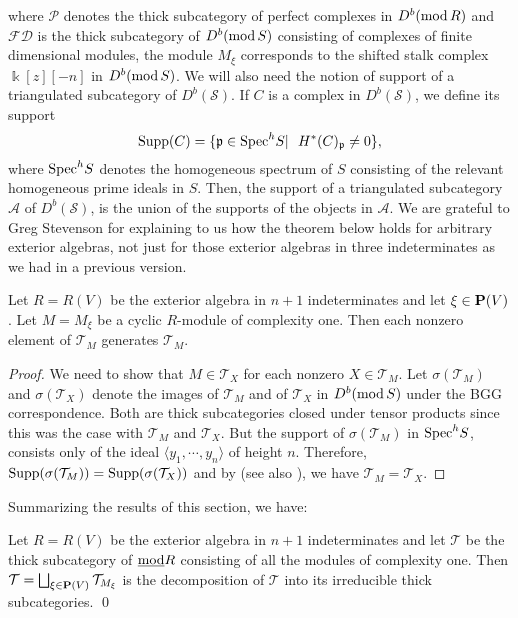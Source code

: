 \documentclass[10pt]{amsart}
\begin{document}
\noindent where $\mathcal P$ denotes the thick subcategory of perfect complexes in $D^b(\operatorname{mod} R)$ and $\mathcal {FD}$ is the thick subcategory of $D^b(\operatorname{mod} S)$ consisting of complexes of finite dimensional modules, the module $M_{\xi}$ corresponds to the shifted stalk complex $\Bbbk[z][-n]$ in $D^b(\operatorname{mod} S)$. We will also need the notion of support of a triangulated subcategory of $D^b(\mathcal S)$. If $C$ is a complex in $D^b(\mathcal S)$, we define its support $$\operatorname{Supp}(C)=\{\frak p\in\mbox{Spec}^hS|\ \ H^*(C)_{\frak p}\ne 0\},$$ where $\mbox{Spec}^hS$ denotes the homogeneous spectrum of $S$ consisting of the relevant homogeneous prime ideals in $S$. Then, the support of a triangulated subcategory $\mathcal A$ of $D^b(\mathcal S)$, is the union of the supports of the objects in $\mathcal A$. We are grateful to Greg Stevenson for explaining to us how the theorem below holds for arbitrary exterior algebras, not just for those exterior algebras in three indeterminates as we had in a previous version.

 \begin{thm} Let  $R=R(V)$ be the exterior algebra in $n+1$ indeterminates and let $\xi\in{\bf P}(V)$. Let 
$M=M_{\xi}$ be a cyclic $R$-module of complexity one. Then each nonzero element of $\mathcal T_M$ generates $\mathcal T_M$. 
 \end{thm}
 \begin{proof}  
 We need to show that $M\in\mathcal T_X$ for each nonzero 
$X\in\mathcal T_M$. Let $\sigma(\mathcal T_M)$ and $\sigma(\mathcal T_X)$ denote the images of $\mathcal T_M$ and of $\mathcal T_X$ in $D^b(\operatorname{mod} S)$ under the BGG correspondence. Both are thick subcategories closed under tensor products since this was the case with $\mathcal T_M$ and $\mathcal T_X$. But the support of $\sigma(\mathcal T_M)$ in $\mbox{Spec}^hS$, consists only of the ideal $\langle y_1,\cdots,y_n\rangle$ of height $n$. Therefore, $\operatorname{Supp}(\sigma(\mathcal T_M))=\operatorname{Supp}(\sigma(\mathcal T_X))$ and by \cite[Theorem 3.15]{T} (see also \cite{DS}), we have $\mathcal T_M=\mathcal T_X$.
\end{proof}

 
 \noindent  Summarizing the results of this section, we have:
 
 \begin{thm}\label{modules of cx 1} Let $R=R(V)$ be the exterior algebra in $n+1$ indeterminates and let $\mathcal T$ be the thick subcategory of $\underline{\operatorname{mod}} R$ 
consisting of all the modules of complexity one. Then 
$\mathcal T=\bigsqcup_{\xi\in {\bf P}(V)}\mathcal T_{M_{\xi}}$ is the decomposition 
of $\mathcal T$ into its irreducible thick subcategories. \qed
 \end{thm}
\end{document}

